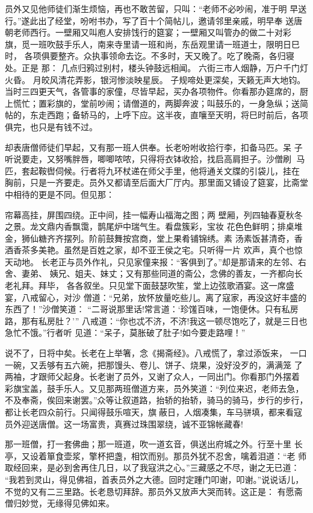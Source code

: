 员外又见他师徒们渐生烦恼，再也不敢苦留，只叫：“老师不必吵闹，准于明
早送行。”遂此出了经堂，吩咐书办，写了百十个简帖儿，邀请邻里亲戚，明早奉
送唐朝老师西行。一壁厢又叫庖人安排饯行的筵宴；一壁厢又叫管办的做二十对彩
旗，觅一班吹鼓手乐人，南来寺里请一班和尚，东岳观里请一班道士，限明日巳时，
各项俱要整齐。众执事领命去讫。不多时，天又晚了。吃了晚斋，各归寝处。正是
那：
几点归鸦过别村，楼头钟鼓远相闻。
六街三市人烟静，万户千门灯火昏。
月皎风清花弄影，银河惨淡映星辰。
子规啼处更深矣，天籁无声大地钧。
当时三四更天气，各管事的家僮，尽皆早起，买办各项物件。你看那办筵席的，厨
上慌忙；置彩旗的，堂前吵闹；请僧道的，两脚奔波；叫鼓乐的，一身急纵；送简
帖的，东走西跑；备轿马的，上呼下应。这半夜，直嚷至天明，将巳时前后，各项
俱完，也只是有钱不过。

却表唐僧师徒们早起，又有那一班人供奉。长老吩咐收拾行李，扣备马匹。呆
子听说要走，又努嘴胖唇，唧唧哝哝，只得将衣钵收拾，找启高肩担子。沙僧刷
马匹，套起鞍辔伺候。行者将九环杖递在师父手里，他将通关文牒的引袋儿，挂在
胸前，只是一齐要走。员外又都请至后面大厂厅内。那里面又铺设了筵宴，比斋堂
中相待的更是不同。但见那：

帘幕高挂，屏围四绕。正中间，挂一幅寿山福海之图；两
壁厢，列四轴春夏秋冬之景。龙文鼎内香飘霭，鹊尾炉中瑞气生。看盘簇彩，宝妆
花色色鲜明；排桌堆金，狮仙糖齐齐摆列。阶前鼓舞按宫商，堂上果肴铺锦绣。素
汤素饭甚清奇，香酒香茶多美艳。虽然是百姓之家，却不亚王侯之宅。只听得一片
欢声，真个也惊天动地。
长老正与员外作礼，只见家僮来报：“客俱到了。”却是那请来的左邻、右舍、妻弟、
姨兄、姐夫、妹丈；又有那些同道的斋公，念佛的善友，一齐都向长老礼拜。拜毕，
各各叙坐。只见堂下面鼓瑟吹笙，堂上边弦歌酒宴。这一席盛宴，八戒留心，对沙
僧道：“兄弟，放怀放量吃些儿。离了寇家，再没这好丰盛的东西了！”沙僧笑道：
“二哥说那里话!常言道：‘珍馐百味，一饱便休。只有私房路，那有私房肚？’”
八戒道：“你也忒不济，不济!我这一顿尽饱吃了，就是三日也急忙不饿。”行者听
见道：“呆子，莫胀破了肚子!如今要走路哩！”

说不了，日将中矣。长老在上举箸，念《揭斋经》。八戒慌了，拿过添饭来，
一口一碗，又丢够有五六碗，把那馒头、卷儿、饼子、烧果，没好没歹的，满满笼
了两袖，才跟师父起身。长老谢了员外，又谢了众人，一同出门。你看那门外摆着
彩旗宝盖，鼓手乐人。又见那两班僧道方来，员外笑道：“列位来迟，老师去急，
不及奉斋，俟回来谢罢。”众等让叙道路，抬轿的抬轿，骑马的骑马，步行的步行，
都让长老四众前行。只闻得鼓乐喧天，旗蔽日，人烟凑集，车马骈填，都来看寇
员外迎送唐僧。这一场富贵，真赛过珠围翠绕，诚不亚锦帐藏春!

那一班僧，打一套佛曲；那一班道，吹一道玄音，俱送出府城之外。行至十里
长亭，又设着箪食壶浆，擎杯把盏，相饮而别。那员外犹不忍舍，噙着泪道：“老
师取经回来，是必到舍再住几日，以了我寇洪之心。”三藏感之不尽，谢之无已道：
“我若到灵山，得见佛祖，首表员外之大德。回时定踵门叩谢，叩谢。”说说话儿，
不觉的又有二三里路。长老恳切拜辞。那员外又放声大哭而转。这正是：
有愿斋僧归妙觉，无缘得见佛如来。

